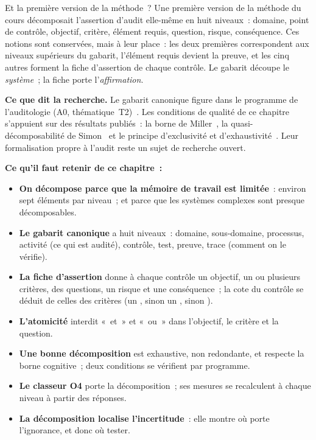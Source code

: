 \begin{boiteRemarque}{Et la première version de la méthode~?}
Une première version de la méthode du cours décomposait l'assertion
d'audit elle-même en huit niveaux~: domaine, point de contrôle, objectif,
critère, élément requis, question, risque, conséquence. Ces notions sont
conservées, mais à leur place~: les deux premières correspondent aux
niveaux supérieurs du gabarit, l'élément requis devient la preuve, et les
cinq autres forment la fiche d'assertion de chaque contrôle. Le gabarit
découpe le \emph{système}~; la fiche porte l'\emph{affirmation}.
\end{boiteRemarque}

\begin{boxinfo}
\textbf{Ce que dit la recherche.} Le gabarit canonique figure dans le
programme de l'auditologie (A0, thématique~T2)~\cite{minka2026auditologie}.
Les conditions de qualité de ce chapitre s'appuient sur des résultats
publiés~: la borne de Miller~\cite{miller1956}, la quasi-décomposabilité de
Simon~\cite{simon1962complexity} et le principe d'exclusivité et
d'exhaustivité~\cite{minto2009pyramid}. Leur formalisation propre à l'audit
reste un sujet de recherche ouvert.
\end{boxinfo}

\separateur

\begin{boxresume}
\textbf{Ce qu'il faut retenir de ce chapitre~:}
\begin{itemize}
    \item \textbf{On décompose parce que la mémoire de travail est
          limitée}~: environ sept éléments par niveau~; et parce que les
          systèmes complexes sont presque décomposables.
    \item \textbf{Le gabarit canonique} a huit niveaux~: domaine,
          sous-domaine, processus, activité (ce qui est audité), contrôle,
          test, preuve, trace (comment on le vérifie).
    \item \textbf{La fiche d'assertion} donne à chaque contrôle un objectif,
          un ou plusieurs critères, des questions, un risque et une
          conséquence~; la cote du contrôle se déduit de celles des
          critères (un \NON{}, sinon un \NEK{}, sinon \OUI{}).
    \item \textbf{L'atomicité} interdit «~et~» et «~ou~» dans l'objectif, le
          critère et la question.
    \item \textbf{Une bonne décomposition} est exhaustive, non redondante,
          et respecte la borne cognitive~; deux conditions se vérifient par
          programme.
    \item \textbf{Le classeur O4} porte la décomposition~; ses mesures se
          recalculent à chaque niveau à partir des réponses.
    \item \textbf{La décomposition localise l'incertitude}~: elle montre où
          porte l'ignorance, et donc où tester.
\end{itemize}
\end{boxresume}

